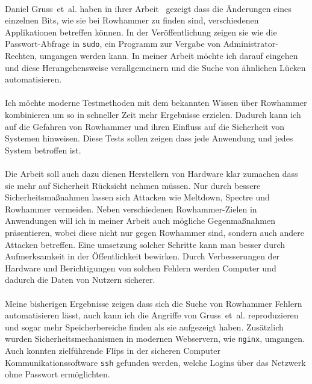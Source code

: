 \documentclass[a4paper]{article}
\newcommand{\etal}{et~al. }
\begin{document}
\paragraph{}

Daniel Gruss~\etal haben in ihrer Arbeit~\cite{flipinthewall} gezeigt dass die Änderungen eines einzelnen Bits, wie sie bei Rowhammer zu finden sind, verschiedenen Applikationen betreffen können. In der Veröffentlichung zeigen sie wie die Passwort-Abfrage in \texttt{sudo}, ein Programm zur Vergabe von Administrator-Rechten, umgangen werden kann. In meiner Arbeit möchte ich darauf eingehen und diese Herangehensweise verallgemeinern und die Suche von ähnlichen Lücken automatisieren.

\paragraph{}

Ich möchte moderne Testmethoden mit dem bekannten Wissen über Rowhammer kombinieren um so in schneller Zeit mehr Ergebnisse erzielen. Dadurch kann ich auf die Gefahren von Rowhammer und ihren Einfluss auf die Sicherheit von Systemen hinweisen. Diese Tests sollen zeigen dass jede Anwendung und jedes System betroffen ist. 

\paragraph{}

Die Arbeit soll auch dazu dienen Herstellern von Hardware klar zumachen dass sie mehr auf Sicherheit Rücksicht nehmen müssen. Nur durch bessere Sicherheitsmaßnahmen lassen sich Attacken wie Meltdown, Spectre und Rowhammer vermeiden. Neben verschiedenen Rowhammer-Zielen in Anwendungen will ich in meiner Arbeit auch mögliche Gegenmaßnahmen präsentieren, wobei diese nicht nur gegen Rowhammer sind, sondern auch andere Attacken betreffen. Eine umsetzung solcher Schritte kann man besser durch Aufmerksamkeit in der Öffentlichkeit bewirken. Durch Verbesserungen der Hardware und Berichtigungen von solchen Fehlern werden Computer und dadurch die Daten von Nutzern sicherer.

\paragraph{}

Meine bisherigen Ergebnisse zeigen dass sich die Suche von Rowhammer Fehlern automatisieren lässt, auch kann ich die Angriffe von Gruss~\etal\cite{flipinthewall} reproduzieren und sogar mehr Speicherbereiche finden als sie aufgezeigt haben. Zusätzlich wurden Sicherheitsmechanismen in modernen Webservern, wie \texttt{nginx}, umgangen. Auch konnten zielführende Flips in der sicheren Computer Kommunikationssoftware \texttt{ssh} gefunden werden, welche Logins über das Netzwerk ohne Passwort ermöglichten.


\pagebreak



\end{document}
